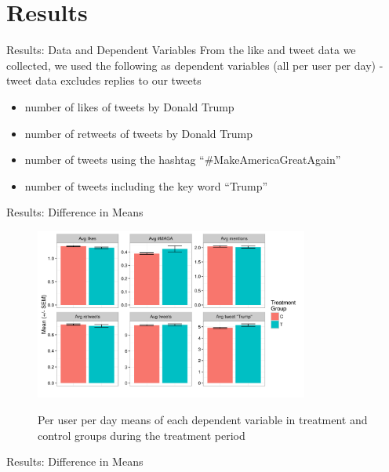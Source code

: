 \documentclass[10pt]{beamer}\usepackage[]{graphicx}\usepackage[]{color}
\begin{document}
\section{Results}
\begin{frame}{Results: Data and Dependent Variables}
From the like and tweet data we collected, we used the following as dependent variables (all per user per day) - tweet data excludes replies to our tweets

\begin{itemize}
\item number of likes of tweets by Donald Trump
\item number of retweets of tweets by Donald Trump
\item number of tweets using the hashtag ``\#MakeAmericaGreatAgain''
\item number of tweets including the key word ``Trump''
\end{itemize} 
\end{frame}


\begin{frame}{Results: Difference in Means}

\begin{figure}
\includegraphics[width=9cm]{../plots/mean_bars.png}
\label{fig:mean_bars}
\caption{Per user per day means of each dependent variable in treatment and control groups during the treatment period}
\end{figure}

\end{frame}


\begin{frame}{Results: Difference in Means}

\small


\end{frame}
\end{document}
